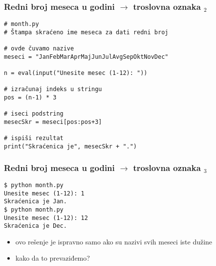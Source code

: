 \documentclass[utf8,compress,aspectratio=169]{beamer}
\begin{document}

\begin{frame}[fragile,shrink=10]
  \frametitle{Redni broj meseca u godini $\rightarrow$ troslovna oznaka $_2$}
\begin{verbatim}
# month.py
# Štampa skraćeno ime meseca za dati redni broj

# ovde čuvamo nazive
meseci = "JanFebMarAprMajJunJulAvgSepOktNovDec"

n = eval(input("Unesite mesec (1-12): "))

# izračunaj indeks u stringu
pos = (n-1) * 3

# iseci podstring
mesecSkr = meseci[pos:pos+3]

# ispiši rezultat
print("Skraćenica je", mesecSkr + ".")
\end{verbatim}
\end{frame}

\begin{frame}[fragile]
  \frametitle{Redni broj meseca u godini $\rightarrow$ troslovna oznaka $_3$}
\begin{verbatim}
$ python month.py
Unesite mesec (1-12): 1
Skraćenica je Jan.
$ python month.py
Unesite mesec (1-12): 12
Skraćenica je Dec.
\end{verbatim}
  \begin{itemize}
    \item ovo rešenje je ispravno samo ako su nazivi svih meseci iste dužine
    \item kako da to prevaziđemo?
  \end{itemize}
\end{frame}
\end{document}
